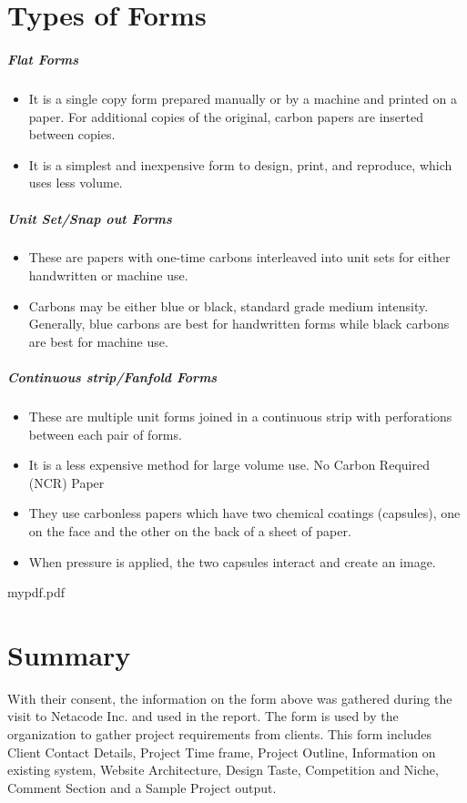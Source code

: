 \documentclass[a4paper,12pt]{book}
\begin{document}
	\section{Types of Forms}
	\subparagraph{Flat Forms}
	\begin{itemize}
	\item	It is a single copy form prepared manually or by a machine and printed on a paper. For additional copies of the original, carbon papers are inserted between copies.
	\item	It is a simplest and inexpensive form to design, print, and reproduce, which uses less volume.
	\end{itemize}
\subparagraph{Unit Set/Snap out Forms}
	\begin{itemize}
	\item	These are papers with one-time carbons interleaved into unit sets for either handwritten or machine use.
	\item	Carbons may be either blue or black, standard grade medium intensity. Generally, blue carbons are best for handwritten forms while black carbons are best for machine use.
	\end{itemize}
	\subparagraph{Continuous strip/Fanfold Forms}
	\begin{itemize}
	\item	These are multiple unit forms joined in a continuous strip with perforations between each pair of forms.
	\item	It is a less expensive method for large volume use.
	No Carbon Required (NCR) Paper
	\item	They use carbonless papers which have two chemical coatings (capsules), one on the face and the other on the back of a sheet of paper.
	\item	When pressure is applied, the two capsules interact and create an image.
	\end{itemize}
	 {mypdf.pdf}
	\section{Summary}
	With their consent, the information on the form above was gathered during the visit to Netacode Inc. and used in the report. The form is used by the organization to gather project requirements from clients. This form includes Client Contact Details, Project Time frame, Project Outline, Information on existing system, Website Architecture, Design Taste, Competition and Niche, Comment Section and a Sample Project output.

	
\end{document}
